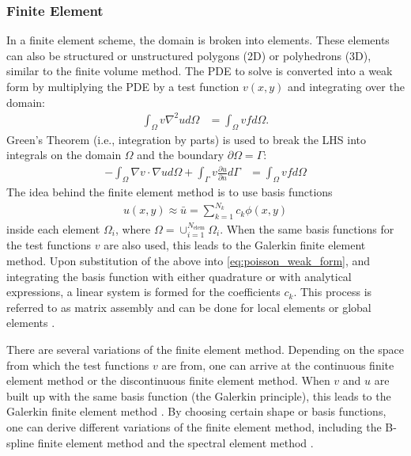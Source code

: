 \subsubsection{Finite Element}

In a finite element scheme, the domain is broken into elements. These elements can also be structured or unstructured polygons (2D) or polyhedrons (3D), similar to the finite volume method. The PDE to solve is converted into a weak form by multiplying the PDE by a test function $v(x,y)$ and integrating over the domain:
\begin{align}
    \int_{\Omega} v \nabla^2 u d\Omega &= \int_{\Omega} vf d\Omega.
\end{align}
Green's Theorem (i.e., integration by parts) is used to break the LHS into integrals on the domain $\Omega$ and the boundary $\partial \Omega = \Gamma$:
\begin{align}
    -\int_{\Omega} \nabla v \cdot \nabla u d\Omega + \int_{\Gamma} v \frac{\partial u}{\partial n} d\Gamma &= \int_{\Omega} vf d\Omega
    \label{eq:poisson_weak_form}
\end{align}
The idea behind the finite element method is to use basis functions
\begin{align}
    u(x,y) \approx \bar{u} = \sum_{k=1}^{N_k} c_k \phi(x,y)
\end{align}
inside each element $\Omega_i$, where $\Omega = \cup_{i = 1}^{N_{\text{elem}}} \Omega_i$. When the same basis functions for the test functions $v$ are also used, this leads to the Galerkin finite element method. Upon substitution of the above into \ref{eq:poisson_weak_form}, and integrating the basis function with either quadrature or with analytical expressions, a linear system is formed for the coefficients $c_k$. This process is referred to as matrix assembly and can be done for local elements or global elements \citep{giraldo2020introduction}.

There are several variations of the finite element method. Depending on the space from which the test functions $v$ are from, one can arrive at the continuous finite element method or the discontinuous finite element method. When $v$ and $u$ are built up with the same basis function (the Galerkin principle), this leads to the Galerkin finite element method \citep{thomee2007galerkin}. By choosing certain shape or basis functions, one can derive different variations of the finite element method, including the B-spline finite element method \citep{kagan1998new} and the spectral element method \citep{patera1984spectral}.

